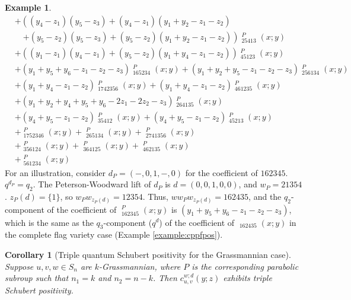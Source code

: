 \documentclass{amsart}
\newtheorem{corollary}[lemma]{Corollary}
\theoremstyle{definition}
\newtheorem{example}[lemma]{Example}
\theoremstyle{remark}
\numberwithin{equation}{section}
\DeclareMathOperator{\qsch}{\widetilde{\mathfrak{S}}}
\begin{document}
\begin{example}
\begin{align*}
&+ \left(\left(y_{4} - z_{1}\right) \left(y_{5} - z_{3}\right) + \left(y_{4} - z_{1}\right) \left(y_{1} + y_{2} - z_{1} - z_{2}\right) \right. \\
&\quad \left. + \left(y_{5} - z_{2}\right) \left(y_{5} - z_{3}\right) + \left(y_{5} - z_{2}\right) \left(y_{1} + y_{2} - z_{1} - z_{2}\right)\right) \qsch_{25413}^P{\left(x; y \right)} \\
&+ \left(\left(y_{1} - z_{1}\right) \left(y_{4} - z_{1}\right) + \left(y_{5} - z_{2}\right) \left(y_{1} + y_{4} - z_{1} - z_{2}\right)\right) \qsch_{45123}^P{\left(x; y \right)} \\
&+ \left(y_{1} + y_{5} + y_{6} - z_{1} - z_{2} - z_{3}\right) \qsch_{165234}^P{\left(x; y \right)} + \left(y_{1} + y_{2} + y_{5} - z_{1} - z_{2} - z_{3}\right) \qsch_{256134}^P{\left(x; y \right)} \\
&+ \left(y_{1} + y_{4} - z_{1} - z_{2}\right) \qsch_{1742356}^P{\left(x; y \right)} + \left(y_{1} + y_{4} - z_{1} - z_{2}\right) \qsch_{461235}^P{\left(x; y \right)} \\
&+ \left(y_{1} + y_{2} + y_{4} + y_{5} + y_{6} - 2 z_{1} - 2 z_{2} - z_{3}\right) \qsch_{264135}^P{\left(x; y \right)} \\
&+ \left(y_{4} + y_{5} - z_{1} - z_{2}\right) \qsch_{35412}^P{\left(x; y \right)} + \left(y_{4} + y_{5} - z_{1} - z_{2}\right) \qsch_{45213}^P{\left(x; y \right)} \\
&+ \qsch_{1752346}^P{\left(x; y \right)} + \qsch_{265134}^P{\left(x; y \right)} + \qsch_{2741356}^P{\left(x; y \right)} \\
&+ \qsch_{356124}^P{\left(x; y \right)} + \qsch_{364125}^P{\left(x; y \right)} + \qsch_{462135}^P{\left(x; y \right)} \\
&+ \qsch_{561234}^P{\left(x; y \right)}
\end{align*}
For an illustration, consider $d_P = (-,0,1,-,0)$ for the coefficient of $162345$. $q^{d_P} = q_2$. The Peterson-Woodward lift of $d_P$ is $d = (0,0,1,0,0)$, and $w_P = 21354$. $z_P(d) = \{1\}$, so $w_Pw_{z_P(d)} = 12354$. Thus, $ww_Pw_{z_P(d)} = 162435$, and the $q_2$-component of the coefficient of $\qsch_{162345}^P(x;y)$ is $(y_1+y_5+y_6-z_1-z_2-z_3)$, which is the same as the $q_3$-component ($q^d$) of the coefficient of $\qsch_{162435}(x;y)$ in the complete flag variety case (Example \ref{example:cppfpos}).
\end{example}

\begin{corollary}[Triple quantum Schubert positivity for the Grassmannian case]
Suppose $u,v,w\in S_n$ are $k$-Grassmannian, where $P$ is the corresponding parabolic subroup such that $n_1 = k$ and $n_2 = n - k$. Then $c_{u,v}^{w;d}(y;z)$ exhibits triple Schubert positivity.
\end{corollary}
\end{document}
